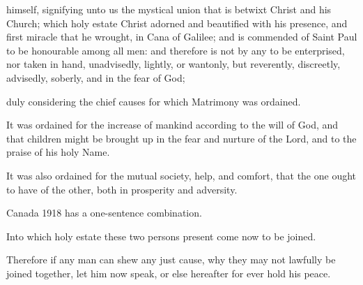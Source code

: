 himself, %
signifying unto us the mystical union that is betwixt Christ and his Church; which holy estate Christ adorned and beautified with his presence, and first miracle that he wrought, in Cana of Galilee; and is commended of Saint Paul to be honourable among all men: and therefore is not by any to be enterprised, nor taken in hand, unadvisedly, lightly, or wantonly,
but reverently, discreetly, advisedly, soberly, and in the fear of God;
\begin{leftbar}
duly considering the 
chief %
causes for which Matrimony was ordained.

It was ordained for the 
increase of mankind according to the will of God, and that children might %
be brought up in the fear and nurture of the Lord, and to the praise of his holy Name.


It was 
also %
ordained for the mutual society, help, and comfort, that the one ought to have of the other, both in prosperity and adversity.

Canada 1918 has a one-sentence combination.
\end{leftbar}

Into which holy estate these two persons present come now to be joined.

Therefore if any man can shew any just cause, why they may not lawfully be joined together, let him now speak, or else hereafter for ever hold his peace.

\smallskip
{}


